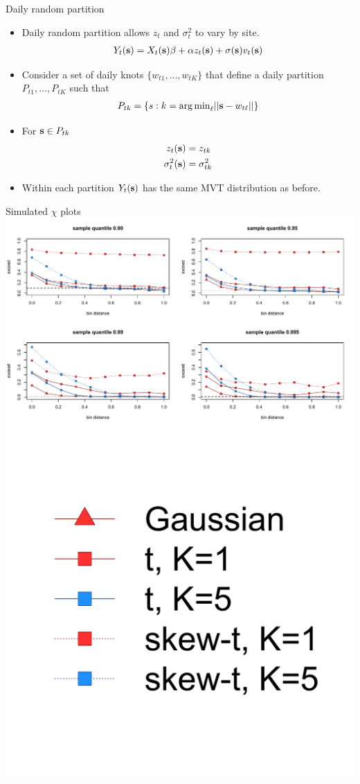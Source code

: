\documentclass{beamer}
\begin{document}
\begin{frame}{Daily random partition}
  \begin{itemize} \setlength{\itemsep}{0.5em}
    \item Daily random partition allows $z_t$ and $\sigma^2_t$ to vary by site.
    \begin{align*}
      Y_t(\mbox{\bf s}) = X_t(\mbox{\bf s}) \beta + \alpha z_t(\mbox{\bf s}) + \sigma(\mbox{\bf s}) v_t(\mbox{\bf s})
    \end{align*}
    \item Consider a set of daily knots $\{w_{t1}, \ldots, w_{tK}\}$ that define a daily partition
    $P_{t1}, \ldots, P_{tK}$ such that
    \begin{align*}
      P_{tk} = \{s : k = {\mathop{\rm arg\, min}}_\ell|| \mbox{\bf s} - w_{t\ell}|| \}
    \end{align*}
    \item For $\mbox{\bf s} \in P_{tk}$
    \begin{align*}
      z_t(\mbox{\bf s}) &= z_{tk}\\
      \sigma^2_t(\mbox{\bf s}) &= \sigma^2_{tk}
    \end{align*}
    \item Within each partition $Y_t(\mbox{\bf s})$ has the same MVT distribution as before.
  \end{itemize}
\end{frame}

\begin{frame}{Simulated $\chi$ plots}
  \centering
  \includegraphics[width=1\linewidth]{./plots/chi-plots.pdf}\\[-0.25in]
  \includegraphics[width=0.2\linewidth]{./plots/chi-legend.pdf}
\end{frame}
\end{document}
